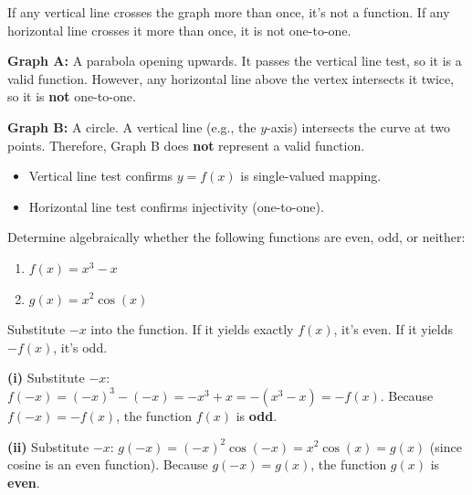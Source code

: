 \begin{hint}
If any vertical line crosses the graph more than once, it's not a function. If any horizontal line crosses it more than once, it is not one-to-one.
\end{hint}

\begin{solution}
\textbf{Graph A:} A parabola opening upwards. It passes the vertical line test, so it is a valid function. However, any horizontal line above the vertex intersects it twice, so it is \textbf{not} one-to-one.

\textbf{Graph B:} A circle. A vertical line (e.g., the $y$-axis) intersects the curve at two points. Therefore, Graph B does \textbf{not} represent a valid function.
\end{solution}

\begin{takeaways}
\begin{itemize}[leftmargin=*]
\item Vertical line test confirms $y=f(x)$ is single-valued mapping.
\item Horizontal line test confirms injectivity (one-to-one).
\end{itemize}
\end{takeaways}

\begin{problem}
Determine algebraically whether the following functions are even, odd, or neither:
\begin{enumerate}[label=(\roman*)]
\item $f(x) = x^3 - x$
\item $g(x) = x^2 \cos(x)$
\end{enumerate}
\end{problem}

\begin{hint}
Substitute $-x$ into the function. If it yields exactly $f(x)$, it's even. If it yields $-f(x)$, it's odd.
\end{hint}

\begin{solution}
\textbf{(i)} Substitute $-x$:
$f(-x) = (-x)^3 - (-x) = -x^3 + x = -(x^3 - x) = -f(x)$.
Because $f(-x) = -f(x)$, the function $f(x)$ is \textbf{odd}.

\textbf{(ii)} Substitute $-x$:
$g(-x) = (-x)^2 \cos(-x) = x^2 \cos(x) = g(x)$ (since cosine is an even function).
Because $g(-x) = g(x)$, the function $g(x)$ is \textbf{even}.
\end{solution}

